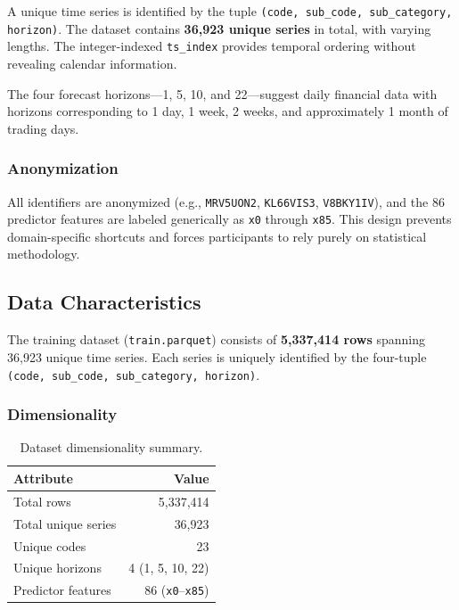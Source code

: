 A unique time series is identified by the tuple \texttt{(code, sub\_code, sub\_category, horizon)}. The dataset contains \textbf{36,923 unique series} in total, with varying lengths. The integer-indexed \texttt{ts\_index} provides temporal ordering without revealing calendar information.

The four forecast horizons---1, 5, 10, and 22---suggest daily financial data with horizons corresponding to 1 day, 1 week, 2 weeks, and approximately 1 month of trading days.

\subsubsection{Anonymization}

All identifiers are anonymized (e.g., \texttt{MRV5UON2}, \texttt{KL66VIS3}, \texttt{V8BKY1IV}), and the 86 predictor features are labeled generically as \texttt{x0} through \texttt{x85}. This design prevents domain-specific shortcuts and forces participants to rely purely on statistical methodology.

\subsection{Data Characteristics}
The training dataset (\texttt{train.parquet}) consists of \textbf{5,337,414 rows} spanning 36,923 unique time series. Each series is uniquely identified by the four-tuple \texttt{(code, sub\_code, sub\_category, horizon)}.

\subsubsection{Dimensionality}

\begin{table}[H]
\centering
\caption{Dataset dimensionality summary.}
\begin{tabular}{lr}
\toprule
\textbf{Attribute} & \textbf{Value} \\
\midrule
Total rows & 5,337,414 \\
Total unique series & 36,923 \\
Unique codes & 23 \\
Unique horizons & 4 (1, 5, 10, 22) \\
Predictor features & 86 (\texttt{x0}--\texttt{x85}) \\
\bottomrule
\end{tabular}
\end{table}


